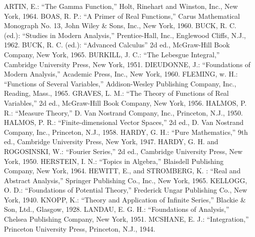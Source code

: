 %
%
% 
% 
%

\biblstarthook{}


\begin{thebibliography}{99.}%


 ARTIN, E.: ``The Gamma Function,'' Holt, Rinehart and Winston, Inc., New York, 1964.
 BOAS, R. P.: ``A Primer of Real Functions,'' Carus Mathematical Monograph No. 13, John Wiley \& Sons, Inc., New York, 1960.
 BUCK, R. C. (ed.): ``Studies in Modern Analysis,'' Prentice-Hall, Inc., Englewood Cliffs, N.J., 1962.
 BUCK, R. C. (ed.): ``Advanced Calculus'' 2d ed., McGraw-Hill Book Company, New York, 1965.
 BURKILL, J. C.: ``The Lebesgue Integral,'' Cambridge University Press, New York, 1951.
 DIEUDONNE, J.: ``Foundations of Modern Analysis,'' Academic Press, Inc., New York, 1960.
 FLEMING, w. H.: ``Functions of Several Variables,'' Addison-Wesley Publishing Company, Inc., Reading, Mass., 1965.
 GRAVES, L. M.: ``The Theory of Functions of Real Variables,'' 2d ed., McGraw-Hill Book Company, New York, 1956.
 HALMOS, P. R.: ``Measure Theory,'' D. Van Nostrand Company, Inc., Princeton, N.J., 1950.
 HALMOS, P. R.: ``Finite-dimensional Vector Spaces,'' 2d ed., D. Van Nostrand Company, Inc., Princeton, N.J., 1958.
 HARDY, G. H.: ``Pure Mathematics,'' 9th ed., Cambridge University Press, New York, 1947.
 HARDY, G. H. and ROGOSINSKI, W.: ``Fourier Series,'' 2d ed., Cambridge University Press, New York, 1950.
 HERSTEIN, I. N.: ``Topics in Algebra,'' Blaisdell Publishing Company, New York, 1964.
 HEWITT, E., and STROMBERG, K. : ``Real and Abstract Analysis,'' Springer Publishing Co., Inc., New York, 1965.
 KELLOGG, O. D.: ``Foundations of Potential Theory,'' Frederick Ungar Publishing Co., New York, 1940.
 KNOPP, K.: ``Theory and Application of Infinite Series,'' Blackie \& Son, Ltd., Glasgow, 1928.
 LANDAU, E. G. H.: ``Foundations of Analysis,'' Chelsea Publishing Company, New York, 1951.
 MCSHANE, E. J.: ``Integration,'' Princeton University Press, Princeton, N.J., 1944.

\end{thebibliography}
